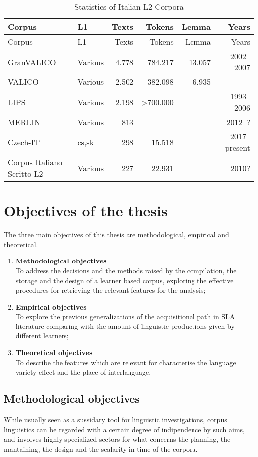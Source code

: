 \documentclass[a4paper,twoside,12pt,chapterprefix=false,bibliography=totocnumbered,listof=flat]{scrbook}
\providecommand{\tightlist}{%
  \setlength{\itemsep}{0pt}\setlength{\parskip}{0pt}}
\theoremstyle{definition}
\theoremstyle{definition}
\theoremstyle{definition}
\theoremstyle{remark}
\begin{document}
\begin{longtable}[]{@{}llrrrr@{}}
\caption{Statistics of Italian L2 Corpora}\tabularnewline
\toprule
Corpus & L1 & Texts & Tokens & Lemma & Years\tabularnewline
\midrule
\endfirsthead
\toprule
Corpus & L1 & Texts & Tokens & Lemma & Years\tabularnewline
\midrule
\endhead
GranVALICO & Various & 4.778 & 784.217 & 13.057 &
2002--2007\tabularnewline
VALICO & Various & 2.502 & 382.098 & 6.935 &\tabularnewline
LIPS & Various & 2.198 & \textgreater{}700.000 & &
1993--2006\tabularnewline
MERLIN & Various & 813 & & & 2012--?\tabularnewline
Czech-IT & cs,sk & 298 & 15.518 & & 2017--present\tabularnewline
Corpus Italiano Scritto L2 & Various & 227 & 22.931 & &
2010?\tabularnewline
\bottomrule
\end{longtable}

\section{Objectives of the thesis}\label{objectives-of-the-thesis}

The three main objectives of this thesis are methodological, empirical
and theoretical.

\begin{enumerate}
\def\labelenumi{\arabic{enumi}.}
\tightlist
\item
  \textbf{Methodological objectives}\\
  To address the decisions and the methods raised by the compilation,
  the storage and the design of a learner based corpus, exploring the
  effective procedures for retrieving the relevant features for the
  analysis;
\item
  \textbf{Empirical objectives}\\
  To explore the previous generalizations of the acquisitional path in
  SLA literature comparing with the amount of linguistic productions
  given by different learners;
\item
  \textbf{Theoretical objectives}\\
  To describe the features which are relevant for characterise the
  language variety effect and the place of interlanguage.
\end{enumerate}

\subsection{Methodological objectives}\label{methodological-objectives}

While usually seen as a sussidary tool for linguistic investigations,
corpus linguistics can be regarded with a certain degree of indipendence
by such aims, and involves highly specialized sectors for what concerns
the planning, the mantaining, the design and the scalarity in time of
the corpora.
\end{document}
